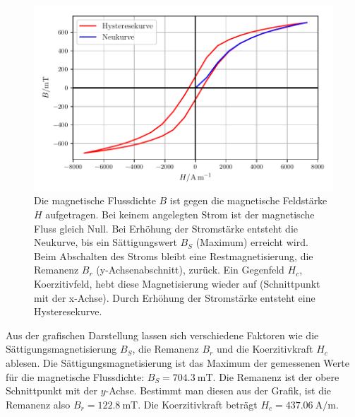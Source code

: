 \begin{figure}
    \centering
    \includegraphics{build/plotc.pdf}
    \caption{Die magnetische Flussdichte $B$ ist gegen die magnetische Feldstärke $H$
    aufgetragen. Bei keinem angelegten Strom ist der magnetische Fluss
    gleich Null. Bei Erhöhung der Stromstärke entsteht die Neukurve, bis
    ein Sättigungswert $B_{S}$ (Maximum) erreicht wird. Beim Abschalten des Stroms
    bleibt eine Restmagnetisierung, die Remanenz $B_{r}$ (y-Achsenabschnitt),
    zurück. Ein Gegenfeld $H_{c}$, Koerzitivfeld, hebt diese Magnetisierung wieder
    auf (Schnittpunkt mit der x-Achse). Durch Erhöhung der Stromstärke entsteht
    eine Hysteresekurve.}
    \label{plotc}
\end{figure}

\noindent Aus der grafischen Darstellung lassen sich verschiedene Faktoren
wie die Sättigungsmagnetisierung $B_{S}$, die Remanenz $B_{r}$ und die
Koerzitivkraft $H_{c}$ ablesen.
Die Sättigungsmagnetisierung ist das Maximum der gemessenen Werte für
die magnetische Flussdichte: $B_{S} = \SI{704.3}{\milli\tesla}$.
Die Remanenz ist der obere Schnittpunkt mit der $y$-Achse. %
Bestimmt man diesen aus der Grafik, ist die Remanenz also
$B_{r} = \SI{122.8}{\milli\tesla}$.
Die Koerzitivkraft beträgt 
$H_{c} = \SI{437.06}{\ampere\per\meter}$. %

